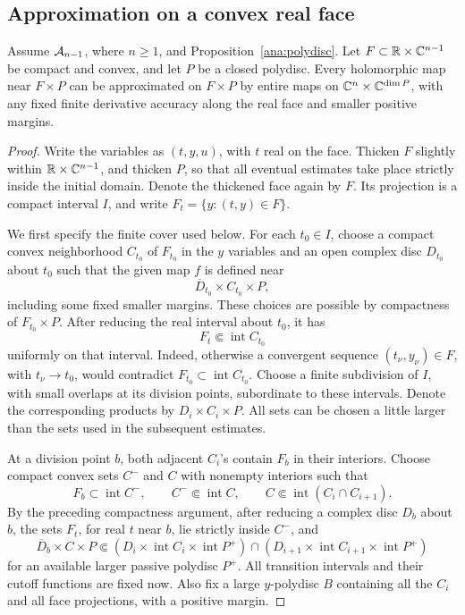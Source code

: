 \subsection{Approximation on a convex real face}

\begin{lemma}\label{ana:face}
Assume \({\cal A}_{n-1}\), where \(n\geq1\), and
Proposition~\ref{ana:polydisc}.  Let
\(F\subset\mathbb R\times\mathbb C^{n-1}\) be compact and convex, and let \(P\)
be a closed polydisc.  Every holomorphic map near \(F\times P\)
can be approximated on \(F\times P\) by entire maps on
\(\mathbb C^n\times\mathbb C^{\dim P}\), with any fixed finite derivative
accuracy along the real face and smaller positive margins.
\end{lemma}

\begin{proof}
Write the variables as \((t,y,u)\), with \(t\) real on the face.
Thicken \(F\) slightly within \(\mathbb R\times\mathbb C^{n-1}\), and thicken
\(P\), so that all eventual estimates take place strictly inside
the initial domain.  Denote the thickened face again by \(F\).
Its projection is a compact interval \(I\), and write
\(F_t=\{y:(t,y)\in F\}\).

We first specify the finite cover used below.  For each \(t_0\in I\),
choose a compact convex neighborhood \(C_{t_0}\) of \(F_{t_0}\)
in the \(y\) variables and an open complex disc \(D_{t_0}\) about \(t_0\)
such that the given map \(f\) is defined near
\[
 \overline D_{t_0}\times C_{t_0}\times P,
\]
including some fixed smaller margins.  These choices are possible
by compactness of \(F_{t_0}\times P\).  After reducing the real
interval about \(t_0\), it has
\[
 F_t\Subset\operatorname{int}C_{t_0}
\]
uniformly on that interval.  Indeed, otherwise a convergent
sequence \((t_\nu,y_\nu)\in F\), with \(t_\nu\to t_0\), would
contradict \(F_{t_0}\subset\operatorname{int}C_{t_0}\).
Choose a finite subdivision of \(I\), with small overlaps at
its division points, subordinate to these intervals.
Denote the corresponding products by \(D_i\times C_i\times P\).
All sets can be chosen a little larger than the sets used in
the subsequent estimates.

At a division point \(b\), both adjacent \(C_i\)'s contain
\(F_b\) in their interiors.  Choose compact convex sets \(C^-\)
and \(C\) with nonempty interiors such that
\[
 F_b\subset\operatorname{int}C^-,
 \qquad C^-\Subset\operatorname{int}C,
 \qquad C\Subset\operatorname{int}(C_i\cap C_{i+1}).
\]
By the preceding compactness argument, after reducing a complex
disc \(D_b\) about \(b\), the sets \(F_t\), for real \(t\) near
\(b\), lie strictly inside \(C^-\), and
\[
 \overline D_b\times C\times P
       \Subset (D_i\times\operatorname{int}C_i\times
                    \operatorname{int}P^+)
          \cap(D_{i+1}\times\operatorname{int}C_{i+1}\times
                    \operatorname{int}P^+)
\]
for an available larger passive polydisc \(P^+\).
All transition intervals and their cutoff functions are fixed now.
Also fix a large \(y\)-polydisc \(B\) containing all the \(C_i\)
and all face projections, with a positive margin.


\end{proof}
